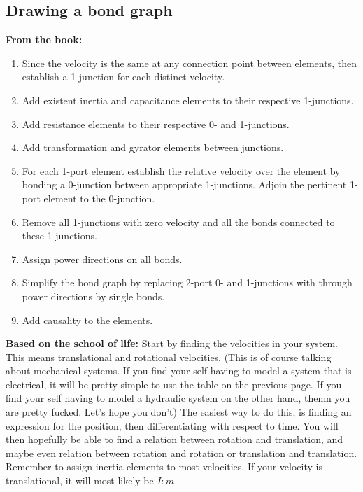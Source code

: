 \subsection{Drawing a bond graph}
\textbf{From the book: }
\begin{enumerate}
    \item Since the velocity is the same at any connection point between elements, then establish a 1-junction for each distinct velocity.
    \item Add existent inertia and capacitance elements to their respective 1-junctions.
    \item Add resistance elements to their respective 0- and 1-junctions.
    \item Add transformation and gyrator elements between junctions.
    \item For each 1-port element establish the relative velocity over the element by bonding a 0-junction between appropriate 1-junctions. Adjoin the pertinent 1-port element to the 0-junction.
    \item Remove all 1-junctions with zero velocity and all the bonds connected to these 1-junctions.
    \item Assign power directions on all bonds.
    \item Simplify the bond graph by replacing 2-port 0- and 1-junctions with through power directions by single bonds.
    \item Add causality to the elements.
\end{enumerate}
\textbf{Based on the school of life: }
Start by finding the velocities in your system. This means translational and rotational velocities. (This is of course talking about mechanical systems. If you find your self having to model a system that is electrical, it will be pretty simple to use the table on the previous page. If you find your self having to model a hydraulic system on the other hand, themn you are pretty fucked. Let's hope you don't)
The easiest way to do this, is finding an expression for the position, then differentiating with respect to time. You will then hopefully be able to find a relation between rotation and translation, and maybe even relation between rotation and rotation or translation and translation. Remember to assign inertia elements to most velocities. If your velocity is translational, it will most likely be $I : m$